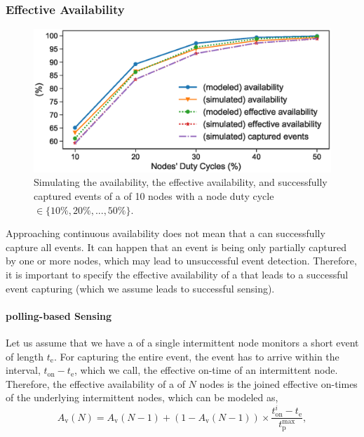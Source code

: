 \subsubsection{Effective Availability}
%
\begin{figure}
		\centering
		\includegraphics[width=\columnwidth]{figures/effective_availability}
		\caption{Simulating the availability, the effective availability, and successfully captured events of a \sys of 10 nodes with a node duty cycle $\in \{10\%, 20\%,...,50\%\}$.}
		\label{fig:cis_simulation}
\end{figure}
%
Approaching continuous availability does not mean that a \sys can successfully capture all events. It can happen that an event is being only partially captured by one or more nodes, which may lead to unsuccessful event detection. Therefore, it is important to specify the effective availability of a \sys that leads to a successful event capturing (which we assume leads to successful sensing). 

\paragraph{polling-based Sensing}
Let us assume that we have a \sys of a single intermittent node monitors a short event of length $t_\text{e}$. For capturing the entire event, the event has to arrive within the interval, $t_\text{on} - t_\text{e}$, which we call, the effective on-time of an intermittent node.
Therefore, the effective availability of a \sys of $N$ nodes is the joined effective on-times of the underlying intermittent nodes, which can be modeled as,
%
\begin{equation}
		A_\text{v}(N) = A_\text{v}(N-1) + \left(1-A_\text{v}(N-1)\right) \times \frac{t_\text{on}^i - t_\text{e}}{t_\text{p}^\text{max}},
		\label{eq:cisSenseModel}
\end{equation} 
%

